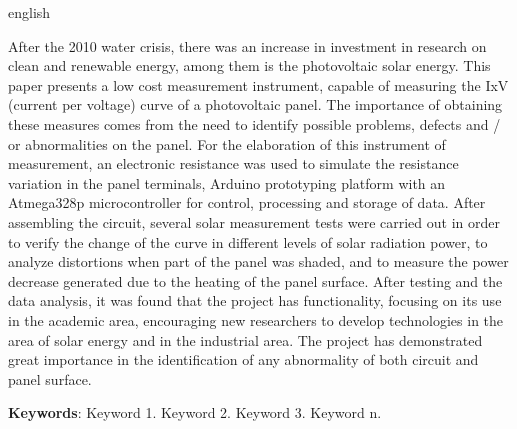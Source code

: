 
\begin{resumo}[Abstract]
	\begin{otherlanguage*}{english}
		
	After the 2010 water crisis, there was an increase in investment in research on clean and renewable energy, among them is the photovoltaic solar energy. This paper presents a low cost measurement instrument, capable of measuring the IxV (current per voltage) curve of a photovoltaic panel. The importance of obtaining these measures comes from the need to identify possible problems, defects and / or abnormalities on the panel. For the elaboration of this instrument of measurement, an electronic resistance was used to simulate the resistance variation in the panel terminals, Arduino prototyping platform with an Atmega328p microcontroller for control, processing and storage of data. After assembling the circuit, several solar measurement tests were carried out in order to verify the change of the curve in different levels of solar radiation power, to analyze distortions when part of the panel was shaded, and to measure the power decrease generated due to the heating of the panel surface. After testing and the data analysis, it was found that the project has functionality, focusing on its use in the academic area, encouraging new researchers to develop technologies in the area of solar energy and in the industrial area. The project has demonstrated great importance in the identification of any abnormality of both circuit and panel surface.

		
		\vspace{\onelineskip}
		 
		\textbf{Keywords}: Keyword 1. Keyword 2. Keyword 3. Keyword n.
	\end{otherlanguage*}
\end{resumo} 